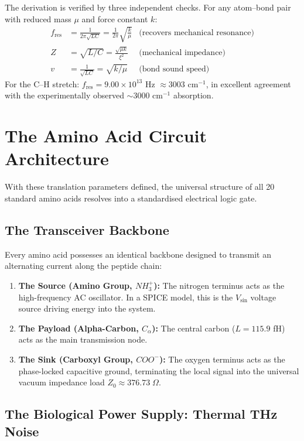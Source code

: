 The derivation is verified by three independent checks. For any atom--bond pair with reduced mass $\mu$ and force constant $k$:
\begin{align}
    f_\text{res} &= \frac{1}{2\pi\sqrt{LC}}
    = \frac{1}{2\pi}\sqrt{\frac{k}{\mu}}
    &\text{(recovers mechanical resonance)} \label{eq:f_check} \\
    Z &= \sqrt{L/C} = \frac{\sqrt{\mu k}}{\xi^2}
    &\text{(mechanical impedance)} \label{eq:Z_check} \\
    v &= \frac{1}{\sqrt{LC}} = \sqrt{k/\mu}
    &\text{(bond sound speed)} \label{eq:v_check}
\end{align}
For the C--H stretch: $f_\text{res} = 9.00 \times 10^{13}$ Hz $\approx 3003$ cm$^{-1}$, in excellent agreement with the experimentally observed $\sim$3000 cm$^{-1}$ absorption.

\section{The Amino Acid Circuit Architecture}

With these translation parameters defined, the universal structure of all 20 standard amino acids resolves into a standardised electrical logic gate.

\subsection{The Transceiver Backbone}
Every amino acid possesses an identical backbone designed to transmit an alternating current along the peptide chain:
\begin{enumerate}
    \item \textbf{The Source (Amino Group, {$NH_3^+$}):} The nitrogen terminus acts as the high-frequency AC oscillator. In a SPICE model, this is the $V_\text{sin}$ voltage source driving energy into the system.
    \item \textbf{The Payload (Alpha-Carbon, $C_\alpha$):} The central carbon ($L = 115.9$ fH) acts as the main transmission node.
    \item \textbf{The Sink (Carboxyl Group, {$COO^-$}):} The oxygen terminus acts as the phase-locked capacitive ground, terminating the local signal into the universal vacuum impedance load $Z_0 \approx 376.73\;\Omega$.
\end{enumerate}

\subsection{The Biological Power Supply: Thermal THz Noise}

